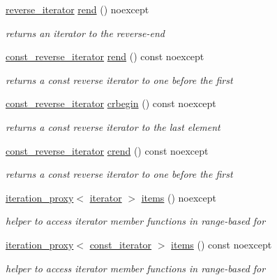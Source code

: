 \begin{DoxyCompactItemize}
\hyperlink{classnlohmann_1_1basic__json_a5b8c0ebedd920b507f4f7ff4e19bf3c6}{reverse\+\_\+iterator} \hyperlink{classnlohmann_1_1basic__json_a7a328b29b290cc300345376c54f618cb}{rend} () noexcept
\begin{DoxyCompactList}\small\item\em returns an iterator to the reverse-\/end \end{DoxyCompactList}\item 
\hyperlink{classnlohmann_1_1basic__json_aa7dba16ed9ee97380aeb17a207dd919a}{const\+\_\+reverse\+\_\+iterator} \hyperlink{classnlohmann_1_1basic__json_a2e4cbf41d593d41847b90aea55e5e84d}{rend} () const noexcept
\begin{DoxyCompactList}\small\item\em returns a const reverse iterator to one before the first \end{DoxyCompactList}\item 
\hyperlink{classnlohmann_1_1basic__json_aa7dba16ed9ee97380aeb17a207dd919a}{const\+\_\+reverse\+\_\+iterator} \hyperlink{classnlohmann_1_1basic__json_a044298d189bdf7e4b36492de9811ddd6}{crbegin} () const noexcept
\begin{DoxyCompactList}\small\item\em returns a const reverse iterator to the last element \end{DoxyCompactList}\item 
\hyperlink{classnlohmann_1_1basic__json_aa7dba16ed9ee97380aeb17a207dd919a}{const\+\_\+reverse\+\_\+iterator} \hyperlink{classnlohmann_1_1basic__json_a223480466a0922267d680ec8f0722d58}{crend} () const noexcept
\begin{DoxyCompactList}\small\item\em returns a const reverse iterator to one before the first \end{DoxyCompactList}\item 
\hyperlink{classnlohmann_1_1basic__json_ae2ce7eec3ae7e7b903e0344e89f0512b}{iteration\+\_\+proxy}$<$ \hyperlink{classnlohmann_1_1basic__json_aa549b2b382916b3baafb526e5cb410bd}{iterator} $>$ \hyperlink{classnlohmann_1_1basic__json_a916a6ba75ec7624e9c6c977a52d6fd17}{items} () noexcept
\begin{DoxyCompactList}\small\item\em helper to access iterator member functions in range-\/based for \end{DoxyCompactList}\item 
\hyperlink{classnlohmann_1_1basic__json_ae2ce7eec3ae7e7b903e0344e89f0512b}{iteration\+\_\+proxy}$<$ \hyperlink{classnlohmann_1_1basic__json_aebd2cfa7e4ded4e97cde9269bfeeea38}{const\+\_\+iterator} $>$ \hyperlink{classnlohmann_1_1basic__json_a4faaed730a81347f2f01e93f37c73823}{items} () const noexcept
\begin{DoxyCompactList}\small\item\em helper to access iterator member functions in range-\/based for \end{DoxyCompactList}\end{DoxyCompactItemize}
